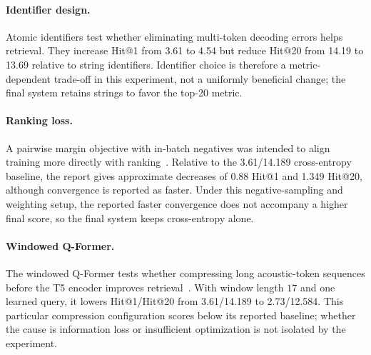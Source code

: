 \paragraph{Identifier design.}
Atomic identifiers test whether eliminating multi-token decoding errors helps
retrieval. They increase Hit@1 from 3.61 to 4.54 but reduce Hit@20 from 14.19
to 13.69 relative to string identifiers. Identifier choice is therefore a
metric-dependent trade-off in this experiment, not a uniformly beneficial
change; the final system retains strings to favor the top-20 metric.

\paragraph{Ranking loss.}
A pairwise margin objective with in-batch negatives was intended to align
training more directly with ranking~\citep{Zeng2023ScalableAE,Sun2023LearningTT}.
Relative to the 3.61/14.189 cross-entropy baseline, the report gives
approximate decreases of 0.88 Hit@1 and 1.349 Hit@20, although convergence is
reported as faster. Under this negative-sampling and weighting setup, the
reported faster convergence does not accompany a higher final score, so the
final system keeps cross-entropy alone.

\paragraph{Windowed Q-Former.}
The windowed Q-Former tests whether compressing long acoustic-token sequences
before the T5 encoder improves retrieval~\citep{Pan2023COSMICDE,Tang2023SALMONNTG}.
With window length \(17\) and one learned query, it lowers Hit@1/Hit@20 from
3.61/14.189 to 2.73/12.584. This particular compression configuration scores
below its reported baseline; whether the cause is information loss or
insufficient optimization is not isolated by the experiment.

